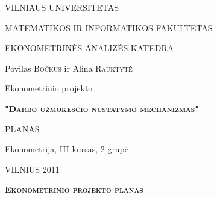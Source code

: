 \documentclass[12pt,a4paper]{article}
\theoremstyle{change}\newtheorem{salyga}{Uždavinys}
\begin{document}
\begin{titlepage}
\centerline{ \large VILNIAUS UNIVERSITETAS}
\bigskip
\centerline{\large MATEMATIKOS IR INFORMATIKOS FAKULTETAS}
\smallskip

\centerline{\large  EKONOMETRINĖS ANALIZĖS KATEDRA}
\vskip 200pt
\centerline{ \large Povilas \textsc{Bočkus} ir Alina \textsc{Rauktytė}}
\vskip 50pt
\centerline{\Large Ekonometrinio projekto}
\vskip 25pt
\centerline{\bf \Large \textsc{"Darbo užmokesčio nustatymo mechanizmas"}}
\vskip 25pt
\centerline{\Large PLANAS}
\bigskip
\vskip 50pt
\hfill Ekonometrija, III kursas, 2 grupė
\vskip 200pt
\centerline{\large VILNIUS 2011}
\end{titlepage}

\begin{center}
\textbf{\Large\textsc{Ekonometrinio projekto planas}}
\end{center}
\vskip 15pt
\end{document}

